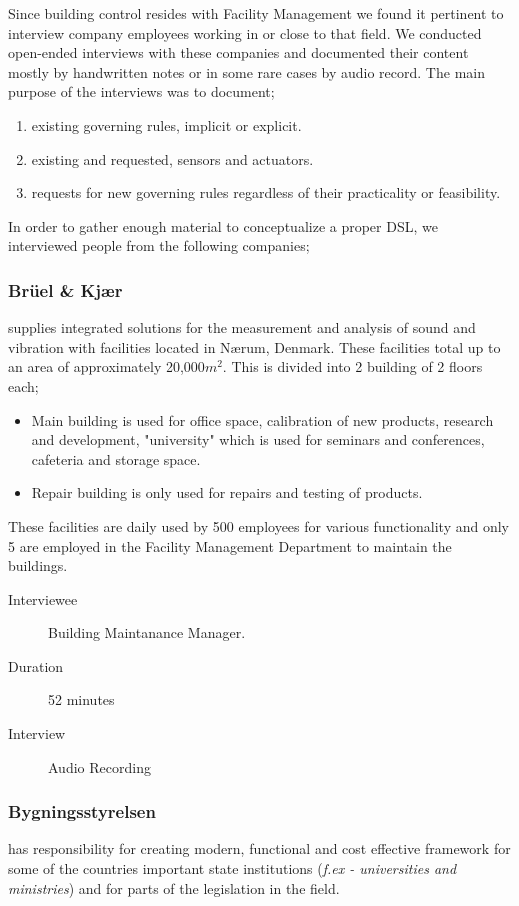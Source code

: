 Since building control resides with Facility Management we found it pertinent to interview company employees working in or close to that field. We conducted open-ended interviews with these companies and documented their content mostly by handwritten notes or in some rare cases by audio record. The main purpose of the interviews was to document;

\begin{enumerate}
	\item existing governing rules, implicit or explicit.
	\item existing and requested, sensors and actuators.
	\item requests for new governing rules regardless of their practicality or feasibility.
\end{enumerate}

In order to gather enough material to conceptualize a proper DSL, we interviewed people from the following companies;

\subsubsection{Br\"{u}el \& Kj\ae r} supplies integrated solutions for the measurement and analysis of sound and vibration with facilities located in N\ae rum, Denmark. These facilities total up to an area of approximately 20,000$m^2$. This is divided into 2 building of 2 floors each; 
\begin{itemize}
	\item Main building is used for office space, calibration of new products, research and development, "university" which is used for seminars and conferences, cafeteria and storage space.
	\item Repair building is only used for repairs and testing of products.
\end{itemize}	
These facilities are daily used by 500 employees for various functionality and only 5 are employed in the Facility Management Department to maintain the buildings.
\begin{description}
	\item[Interviewee] Building Maintanance Manager.
	\item[Duration] 52 minutes
	\item[Interview] Audio Recording
\end{description}

\subsubsection{Bygningsstyrelsen} has responsibility for creating modern, functional and cost effective framework for some of the countries important state institutions (\textit{f.ex - universities and ministries}) and for parts of the legislation in the field.

